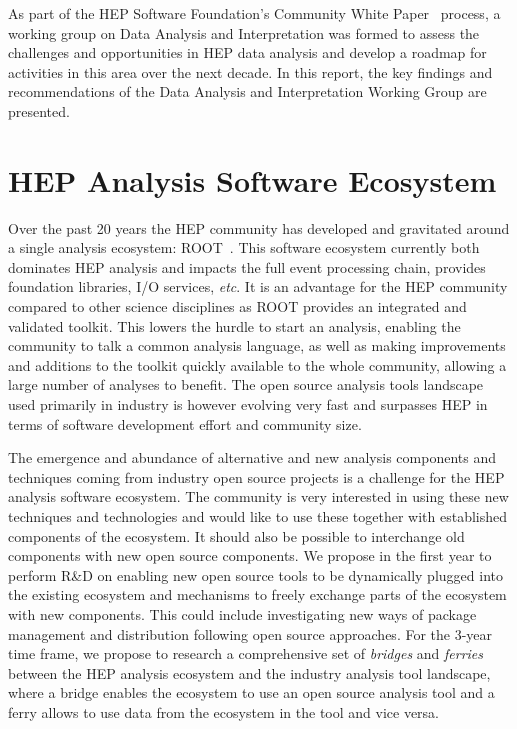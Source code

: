 \documentclass[12pt,a4paper]{article}
\begin{document}
As part of the HEP Software Foundation’s Community White Paper~\cite{HSF-CWP-2017-01} process, a working group on Data Analysis and Interpretation was formed to assess the challenges and opportunities in HEP data analysis and develop a roadmap for activities in this area over the next decade. In this report, the key findings and recommendations of the Data Analysis and Interpretation Working Group are presented.

\section{HEP Analysis Software Ecosystem}

Over the past 20 years the HEP community has developed and gravitated around a single analysis ecosystem: ROOT~\cite{Brun1996}. This software ecosystem currently both dominates HEP analysis and impacts the full event processing chain, provides foundation libraries, I/O services, {\it etc}. It is an advantage for the HEP community compared to other science disciplines as ROOT provides an integrated and validated toolkit. This lowers the hurdle to start an analysis, enabling the community to talk a common analysis language, as well as making improvements and additions to the toolkit quickly available to the whole community, allowing a large number of analyses to benefit. The open source analysis tools landscape used primarily in industry is however evolving very fast and surpasses HEP in terms of software development effort and community size. 

The emergence and abundance of alternative and new analysis components and techniques coming from industry open source projects is a challenge for the HEP analysis software ecosystem. The community is very interested in using these new techniques and technologies and would like to use these together with established components of the ecosystem. It should  also be possible to interchange old components with new open source components. We propose in the first year to perform R\&D on enabling new open source tools to be dynamically plugged into the existing ecosystem and mechanisms to freely exchange parts of the ecosystem with new components. This could include investigating new ways of package management and distribution following open source approaches. For the 3-year time frame, we propose to research a comprehensive set of {\it bridges} and {\it ferries} between the HEP analysis ecosystem and the industry analysis tool landscape, where a bridge enables the ecosystem to use an open source analysis tool and a ferry allows to use data from the ecosystem in the tool and vice versa.
\end{document}
